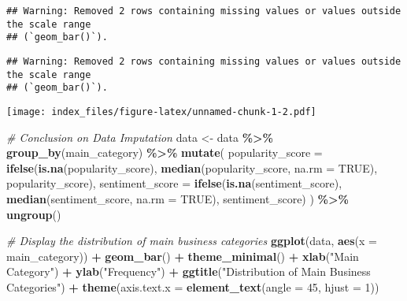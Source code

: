 \documentclass[
]{article}
\newenvironment{Shaded}{\begin{snugshade}}{\end{snugshade}}
\newcommand{\AttributeTok}[1]{\textcolor[rgb]{0.13,0.29,0.53}{#1}}
\newcommand{\CommentTok}[1]{\textcolor[rgb]{0.56,0.35,0.01}{\textit{#1}}}
\newcommand{\ConstantTok}[1]{\textcolor[rgb]{0.56,0.35,0.01}{#1}}
\newcommand{\DecValTok}[1]{\textcolor[rgb]{0.00,0.00,0.81}{#1}}
\newcommand{\FunctionTok}[1]{\textcolor[rgb]{0.13,0.29,0.53}{\textbf{#1}}}
\newcommand{\NormalTok}[1]{#1}
\newcommand{\OtherTok}[1]{\textcolor[rgb]{0.56,0.35,0.01}{#1}}
\newcommand{\SpecialCharTok}[1]{\textcolor[rgb]{0.81,0.36,0.00}{\textbf{#1}}}
\newcommand{\StringTok}[1]{\textcolor[rgb]{0.31,0.60,0.02}{#1}}
\begin{document}
\begin{verbatim}
## Warning: Removed 2 rows containing missing values or values outside the scale range
## (`geom_bar()`).
\end{verbatim}

\begin{verbatim}
## Warning: Removed 2 rows containing missing values or values outside the scale range
## (`geom_bar()`).
\end{verbatim}

\texttt{[image: index\_files/figure-latex/unnamed-chunk-1-2.pdf]}

\begin{Shaded}
\begin{Highlighting}[]
\CommentTok{\# Conclusion on Data Imputation}
\NormalTok{data }\OtherTok{\textless{}{-}}\NormalTok{ data }\SpecialCharTok{\%\textgreater{}\%}
  \FunctionTok{group\_by}\NormalTok{(main\_category) }\SpecialCharTok{\%\textgreater{}\%}
  \FunctionTok{mutate}\NormalTok{(}
    \AttributeTok{popularity\_score =} \FunctionTok{ifelse}\NormalTok{(}\FunctionTok{is.na}\NormalTok{(popularity\_score), }\FunctionTok{median}\NormalTok{(popularity\_score, }\AttributeTok{na.rm =} \ConstantTok{TRUE}\NormalTok{), popularity\_score),}
    \AttributeTok{sentiment\_score =} \FunctionTok{ifelse}\NormalTok{(}\FunctionTok{is.na}\NormalTok{(sentiment\_score), }\FunctionTok{median}\NormalTok{(sentiment\_score, }\AttributeTok{na.rm =} \ConstantTok{TRUE}\NormalTok{), sentiment\_score)}
\NormalTok{  ) }\SpecialCharTok{\%\textgreater{}\%}
  \FunctionTok{ungroup}\NormalTok{()}

\CommentTok{\# Display the distribution of main business categories}
\FunctionTok{ggplot}\NormalTok{(data, }\FunctionTok{aes}\NormalTok{(}\AttributeTok{x =}\NormalTok{ main\_category)) }\SpecialCharTok{+}
  \FunctionTok{geom\_bar}\NormalTok{() }\SpecialCharTok{+}
  \FunctionTok{theme\_minimal}\NormalTok{() }\SpecialCharTok{+}
  \FunctionTok{xlab}\NormalTok{(}\StringTok{"Main Category"}\NormalTok{) }\SpecialCharTok{+}
  \FunctionTok{ylab}\NormalTok{(}\StringTok{"Frequency"}\NormalTok{) }\SpecialCharTok{+}
  \FunctionTok{ggtitle}\NormalTok{(}\StringTok{"Distribution of Main Business Categories"}\NormalTok{) }\SpecialCharTok{+}
  \FunctionTok{theme}\NormalTok{(}\AttributeTok{axis.text.x =} \FunctionTok{element\_text}\NormalTok{(}\AttributeTok{angle =} \DecValTok{45}\NormalTok{, }\AttributeTok{hjust =} \DecValTok{1}\NormalTok{))}
\end{Highlighting}
\end{Shaded}
\end{document}
